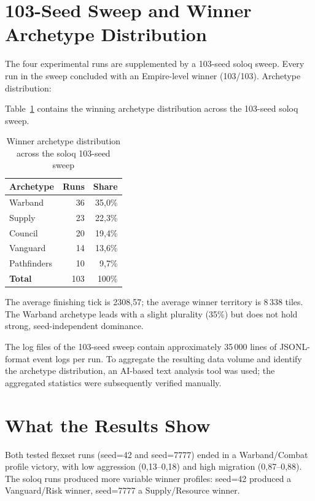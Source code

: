 \section{103-Seed Sweep and Winner Archetype Distribution}

The four experimental runs are supplemented by a 103-seed soloq sweep. Every run in the sweep concluded with an Empire-level winner (103/103). Archetype distribution:

Table~\ref{tab:soloq-sweep-archetypes} contains the winning archetype distribution across the 103-seed soloq sweep.

\begin{table}[H]
\centering
\caption{Winner archetype distribution across the soloq 103-seed sweep}
\label{tab:soloq-sweep-archetypes}
\begin{tabular}{|l|r|r|}
\hline
\textbf{Archetype} & \textbf{Runs} & \textbf{Share} \\
\hline
Warband   & 36 & 35{,}0\% \\
Supply    & 23 & 22{,}3\% \\
Council   & 20 & 19{,}4\% \\
Vanguard  & 14 & 13{,}6\% \\
Pathfinders & 10 & 9{,}7\% \\
\hline
\textbf{Total} & 103 & 100\% \\
\hline
\end{tabular}
\end{table}

The average finishing tick is 2308{,}57; the average winner territory is 8\,338 tiles. The Warband archetype leads with a slight plurality (35\%) but does not hold strong, seed-independent dominance.

The log files of the 103-seed sweep contain approximately 35\,000 lines of JSONL-format event logs per run. To aggregate the resulting data volume and identify the archetype distribution, an AI-based text analysis tool was used; the aggregated statistics were subsequently verified manually.

\section{What the Results Show}

Both tested flexset runs (seed=42 and seed=7777) ended in a Warband/Combat profile victory, with low aggression (0{,}13--0{,}18) and high migration (0{,}87--0{,}88). The soloq runs produced more variable winner profiles: seed=42 produced a Vanguard/Risk winner, seed=7777 a Supply/Resource winner.

